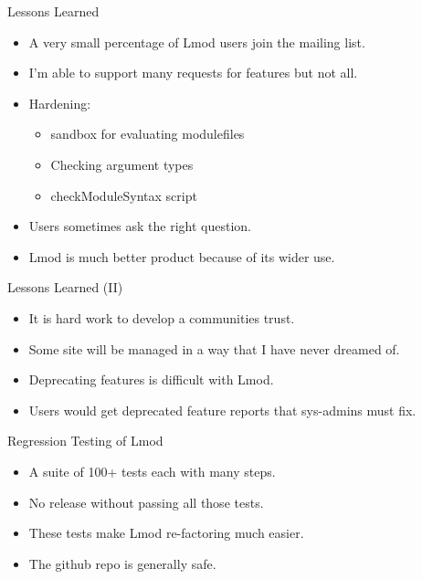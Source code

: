 \documentclass{beamer}
\begin{document}
\begin{frame}{Lessons Learned}
  \begin{itemize}
    \item A very small percentage of Lmod users join the mailing list.
    \item I'm able to support many requests for features but not all.
    \item Hardening:
      \begin{itemize}
        \item sandbox for evaluating modulefiles
        \item Checking argument types
        \item checkModuleSyntax script
      \end{itemize}
    \item Users sometimes ask the right question.
    \item Lmod is much better product because of its wider use.
  \end{itemize}
\end{frame}

\begin{frame}{Lessons Learned (II)}
  \begin{itemize}
    \item It is hard work to develop a communities trust.
    \item Some site will be managed in a way that I have never dreamed of.
    \item Deprecating features is difficult with Lmod.
    \item Users would get deprecated feature reports that sys-admins
      must fix.
  \end{itemize}
\end{frame}


\begin{frame}{Regression Testing of Lmod}
  \begin{itemize}
    \item A suite of 100+ tests each with many steps.
    \item No release without passing all those tests.
    \item These tests make Lmod re-factoring much easier.
    \item The github repo is generally safe.
  \end{itemize}
\end{frame}
\end{document}
